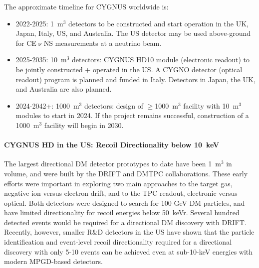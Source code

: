 
The approximate timeline for CYGNUS worldwide is:
\begin{itemize}
\item 2022-2025: 1~m$^3$ detectors to be constructed and start operation in the UK, Japan, Italy, US, and Australia. The US detector may be used above-ground for CE$\upnu$NS measurements at a neutrino beam.
\item 2025-2035: 10~m$^3$ detectors: CYGNUS HD10 module (electronic readout) to be jointly constructed + operated in the US. A CYGNO detector (optical readout) program is planned and funded in Italy. Detectors in Japan, the UK, and Australia are also planned.  
\item 2024-2042+: 1000~m$^3$ detectors: design of $\ge$1000~m$^3$ facility with 10~m$^3$ modules to start in 2024. If the project remains successful, construction of a 1000~m$^3$ facility will begin in 2030.
\end{itemize}

\paragraph{CYGNUS HD in the US: Recoil Directionality below 10~keV}

The largest directional DM detector prototypes to date have been 1~m$^3$ in volume, and were built by the DRIFT and DMTPC collaborations. These early efforts were important in exploring two main approaches to the target gas, negative ion versus electron drift, and to the TPC readout, electronic versus optical. Both detectors were designed to search for 100-GeV DM particles, and have limited directionality for recoil energies below 50~keVr. Several hundred detected events would be required for a directional DM discovery with DRIFT. Recently, however, smaller R\&D detectors in the US have shown that the particle identification and event-level recoil directionality required for a directional discovery with only 5-10 events can be achieved even at sub-10-keV energies with modern MPGD-based detectors.

